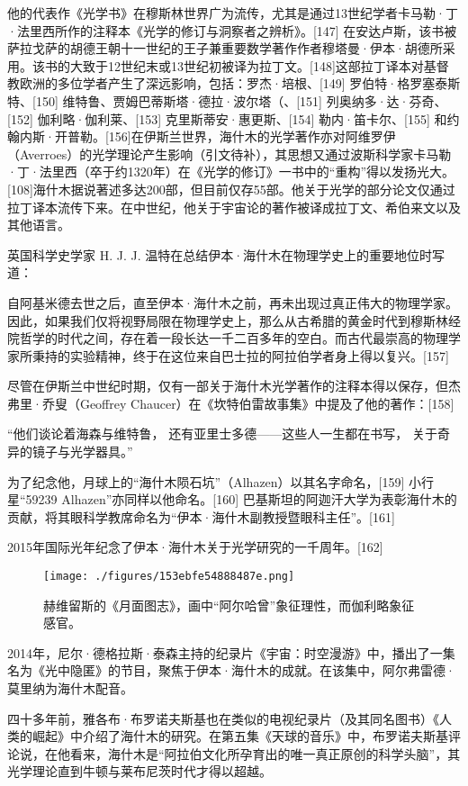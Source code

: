 他的代表作《光学书》在穆斯林世界广为流传，尤其是通过13世纪学者卡马勒·丁·法里西所作的注释本《光学的修订与洞察者之辨析》。[147] 在安达卢斯，该书被萨拉戈萨的胡德王朝十一世纪的王子兼重要数学著作作者穆塔曼·伊本·胡德所采用。该书的大致于12世纪末或13世纪初被译为拉丁文。[148]这部拉丁译本对基督教欧洲的多位学者产生了深远影响，包括：罗杰·培根、[149] 罗伯特·格罗塞泰斯特、[150] 维特鲁、贾姆巴蒂斯塔·德拉·波尔塔（、[151] 列奥纳多·达·芬奇、[152] 伽利略·伽利莱、[153] 克里斯蒂安·惠更斯、[154] 勒内·笛卡尔、[155] 和约翰内斯·开普勒。[156]在伊斯兰世界，海什木的光学著作亦对阿维罗伊（Averroes）的光学理论产生影响（引文待补），其思想又通过波斯科学家卡马勒·丁·法里西（卒于约1320年）在《光学的修订》一书中的“重构”得以发扬光大。[108]海什木据说著述多达200部，但目前仅存55部。他关于光学的部分论文仅通过拉丁译本流传下来。在中世纪，他关于宇宙论的著作被译成拉丁文、希伯来文以及其他语言。

英国科学史学家 H. J. J. 温特在总结伊本·海什木在物理学史上的重要地位时写道：

自阿基米德去世之后，直至伊本·海什木之前，再未出现过真正伟大的物理学家。因此，如果我们仅将视野局限在物理学史上，那么从古希腊的黄金时代到穆斯林经院哲学的时代之间，存在着一段长达一千二百多年的空白。而古代最崇高的物理学家所秉持的实验精神，终于在这位来自巴士拉的阿拉伯学者身上得以复兴。[157]

尽管在伊斯兰中世纪时期，仅有一部关于海什木光学著作的注释本得以保存，但杰弗里·乔叟（Geoffrey Chaucer）在《坎特伯雷故事集》中提及了他的著作：[158]

“他们谈论着海森与维特鲁，
还有亚里士多德——这些人一生都在书写，
关于奇异的镜子与光学器具。”

为了纪念他，月球上的“海什木陨石坑”（Alhazen）以其名字命名，[159] 小行星“59239 Alhazen”亦同样以他命名。[160] 巴基斯坦的阿迦汗大学为表彰海什木的贡献，将其眼科学教席命名为“伊本·海什木副教授暨眼科主任”。[161]

2015年国际光年纪念了伊本·海什木关于光学研究的一千周年。[162]
\begin{figure}[ht]
\centering
\texttt{[image: ./figures/153ebfe54888487e.png]}
\caption{赫维留斯的《月面图志》，画中“阿尔哈曾”象征理性，而伽利略象征感官。} \label{fig_YBH_6}
\end{figure}
2014年，尼尔·德格拉斯·泰森主持的纪录片《宇宙：时空漫游》中，播出了一集名为《光中隐匿》的节目，聚焦于伊本·海什木的成就。在该集中，阿尔弗雷德·莫里纳为海什木配音。

四十多年前，雅各布·布罗诺夫斯基也在类似的电视纪录片（及其同名图书）《人类的崛起》中介绍了海什木的研究。在第五集《天球的音乐》中，布罗诺夫斯基评论说，在他看来，海什木是“阿拉伯文化所孕育出的唯一真正原创的科学头脑”，其光学理论直到牛顿与莱布尼茨时代才得以超越。

